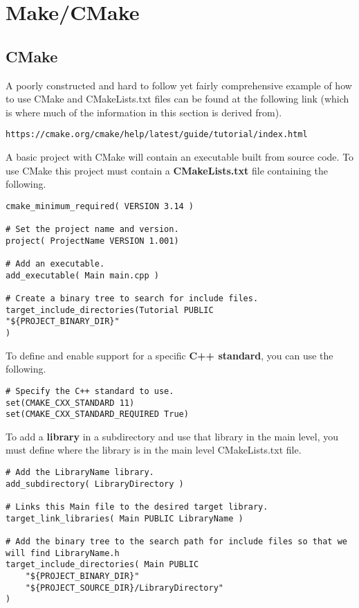 \chapter{Make/CMake}
\thispagestyle{fancy}
\lstset{language=Bash, style=bash}

\section{CMake}

A poorly constructed and hard to follow yet fairly comprehensive example of how to use CMake and CMakeLists.txt files can be found at the following link (which is where much of the information in this section is derived from).
\begin{lstlisting}
https://cmake.org/cmake/help/latest/guide/tutorial/index.html
\end{lstlisting}

A basic project with CMake will contain an executable built from source code. To use CMake this project must contain a \textbf{CMakeLists.txt} file containing the following.
\begin{lstlisting}
cmake_minimum_required( VERSION 3.14 )

# Set the project name and version.
project( ProjectName VERSION 1.001)

# Add an executable.
add_executable( Main main.cpp )

# Create a binary tree to search for include files.
target_include_directories(Tutorial PUBLIC
"${PROJECT_BINARY_DIR}"
)
\end{lstlisting}

To define and enable support for a specific \textbf{C++ standard}, you can use the following.
\begin{lstlisting}
# Specify the C++ standard to use.
set(CMAKE_CXX_STANDARD 11)
set(CMAKE_CXX_STANDARD_REQUIRED True)
\end{lstlisting}

To add a \textbf{library} in a subdirectory and use that library in the main level, you must define where the library is in the main level CMakeLists.txt file.
\begin{lstlisting}
# Add the LibraryName library.
add_subdirectory( LibraryDirectory )

# Links this Main file to the desired target library.
target_link_libraries( Main PUBLIC LibraryName )

# Add the binary tree to the search path for include files so that we will find LibraryName.h
target_include_directories( Main PUBLIC
	"${PROJECT_BINARY_DIR}"
	"${PROJECT_SOURCE_DIR}/LibraryDirectory"
)
\end{lstlisting}

